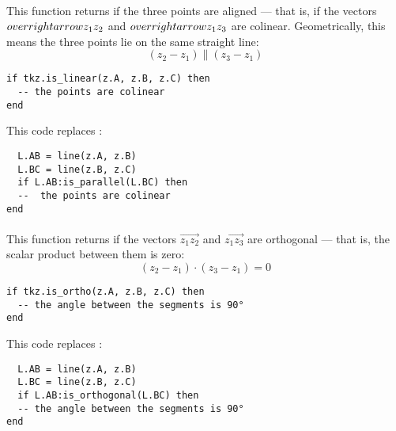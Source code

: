 \paragraph{}  
This function returns  if the three points are aligned — that is, if the vectors $\\overrightarrow{z_1z_2}$ and $\\overrightarrow{z_1z_3}$ are colinear. Geometrically, this means the three points lie on the same straight line:
\[
(z_2 - z_1) \parallel (z_3 - z_1)
\]

\begin{mybox}
\begin{verbatim}
if tkz.is_linear(z.A, z.B, z.C) then
  -- the points are colinear
end
\end{verbatim}
\end{mybox}

This code replaces :

\begin{mybox}
\begin{verbatim}
  L.AB = line(z.A, z.B)
  L.BC = line(z.B, z.C)
  if L.AB:is_parallel(L.BC) then
  --  the points are colinear
end
\end{verbatim}
\end{mybox}

\paragraph{}  
This function returns  if the vectors $\overrightarrow{z_1z_2}$ and $\overrightarrow{z_1z_3}$ are orthogonal — that is, the scalar product between them is zero:
\[
(z_2 - z_1) \cdot (z_3 - z_1) = 0
\]

\begin{mybox}
\begin{verbatim}
if tkz.is_ortho(z.A, z.B, z.C) then
  -- the angle between the segments is 90°
end
\end{verbatim}
\end{mybox}

This code replaces :

\begin{mybox}
\begin{verbatim}
  L.AB = line(z.A, z.B)
  L.BC = line(z.B, z.C)
  if L.AB:is_orthogonal(L.BC) then
  -- the angle between the segments is 90°
end
\end{verbatim}
\end{mybox}

